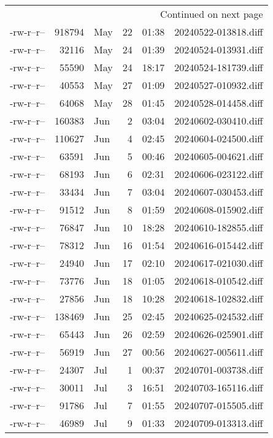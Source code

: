 \documentclass[a4paper]{article}
\begin{document}
\begin{longtable}{lrlrrl}
\hline
\endhead
\hline\multicolumn{6}{r}{Continued on next page} \\
\endfoot
\endlastfoot
\hline
-rw-r--r-- & 918794 & May & 22 & 01:38 & 20240522-013818.diff\\[0pt]
-rw-r--r-- & 32116 & May & 24 & 01:39 & 20240524-013931.diff\\[0pt]
-rw-r--r-- & 55590 & May & 24 & 18:17 & 20240524-181739.diff\\[0pt]
-rw-r--r-- & 40553 & May & 27 & 01:09 & 20240527-010932.diff\\[0pt]
-rw-r--r-- & 64068 & May & 28 & 01:45 & 20240528-014458.diff\\[0pt]
-rw-r--r-- & 160383 & Jun & 2 & 03:04 & 20240602-030410.diff\\[0pt]
-rw-r--r-- & 110627 & Jun & 4 & 02:45 & 20240604-024500.diff\\[0pt]
-rw-r--r-- & 63591 & Jun & 5 & 00:46 & 20240605-004621.diff\\[0pt]
-rw-r--r-- & 68193 & Jun & 6 & 02:31 & 20240606-023122.diff\\[0pt]
-rw-r--r-- & 33434 & Jun & 7 & 03:04 & 20240607-030453.diff\\[0pt]
-rw-r--r-- & 91512 & Jun & 8 & 01:59 & 20240608-015902.diff\\[0pt]
-rw-r--r-- & 76847 & Jun & 10 & 18:28 & 20240610-182855.diff\\[0pt]
-rw-r--r-- & 78312 & Jun & 16 & 01:54 & 20240616-015442.diff\\[0pt]
-rw-r--r-- & 24940 & Jun & 17 & 02:10 & 20240617-021030.diff\\[0pt]
-rw-r--r-- & 73776 & Jun & 18 & 01:05 & 20240618-010542.diff\\[0pt]
-rw-r--r-- & 27856 & Jun & 18 & 10:28 & 20240618-102832.diff\\[0pt]
-rw-r--r-- & 138469 & Jun & 25 & 02:45 & 20240625-024532.diff\\[0pt]
-rw-r--r-- & 65443 & Jun & 26 & 02:59 & 20240626-025901.diff\\[0pt]
-rw-r--r-- & 56919 & Jun & 27 & 00:56 & 20240627-005611.diff\\[0pt]
-rw-r--r-- & 24307 & Jul & 1 & 00:37 & 20240701-003738.diff\\[0pt]
-rw-r--r-- & 30011 & Jul & 3 & 16:51 & 20240703-165116.diff\\[0pt]
-rw-r--r-- & 91786 & Jul & 7 & 01:55 & 20240707-015505.diff\\[0pt]
-rw-r--r-- & 46989 & Jul & 9 & 01:33 & 20240709-013313.diff\\[0pt]

\end{longtable}
\end{document}
